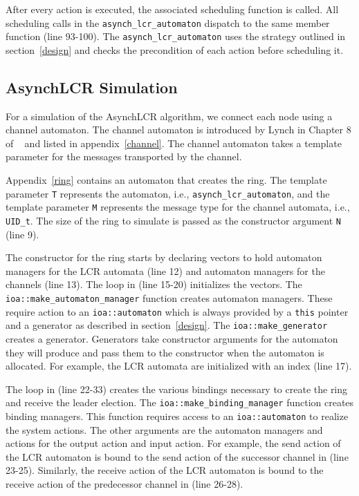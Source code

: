 After every action is executed, the associated scheduling function is called.
All scheduling calls in the \verb+asynch_lcr_automaton+ dispatch to the same member function (line 93-100).
The \verb+asynch_lcr_automaton+ uses the strategy outlined in section~\ref{design} and checks the precondition of each action before scheduling it.

\subsection{AsynchLCR Simulation}

For a simulation of the AsynchLCR algorithm, we connect each node using a channel automaton.
The channel automaton is introduced by Lynch in Chapter 8 of ~\cite{lynch1996distributed} and listed in appendix~\ref{channel}.
The channel automaton takes a template parameter for the messages transported by the channel.

Appendix~\ref{ring} contains an automaton that creates the ring.
The template parameter \verb+T+ represents the automaton, i.e., \verb+asynch_lcr_automaton+, and the template parameter \verb+M+ represents the message type for the channel automata, i.e., \verb+UID_t+.
The size of the ring to simulate is passed as the constructor argument \verb+N+ (line 9).

The constructor for the ring starts by declaring vectors to hold automaton managers for the LCR automata (line 12) and automaton managers for the channels (line 13).
The loop in (line 15-20) initializes the vectors.
The \verb+ioa::make_automaton_manager+ function creates automaton managers.
These require action to an \verb+ioa::automaton+ which is always provided by a \verb+this+ pointer and a generator as described in section~\ref{design}.
The \verb+ioa::make_generator+ creates a generator.
Generators take constructor arguments for the automaton they will produce and pass them to the constructor when the automaton is allocated.
For example, the LCR automata are initialized with an index (line 17).

The loop in (line 22-33) creates the various bindings necessary to create the ring and receive the leader election.
The \verb+ioa::make_binding_manager+ function creates binding managers.
This function requires access to an \verb+ioa::automaton+ to realize the system actions.
The other arguments are the automaton managers and actions for the output action and input action.
For example, the send action of the LCR automaton is bound to the send action of the successor channel in (line 23-25).
Similarly, the receive action of the LCR automaton is bound to the receive action of the predecessor channel in (line 26-28).

